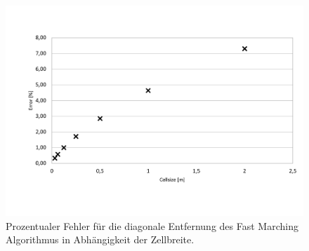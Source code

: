 \begin{figure}[ht]
	\centering
  \includegraphics[width=\textwidth]{abbildungen/vergleich_euklid_fast_marching/EuklidFastMarchingError.pdf}
	\caption{Prozentualer Fehler für die diagonale Entfernung des Fast Marching Algorithmus in Abhängigkeit der Zellbreite.}
	\label{fig_fast_marching_error_cellsize}
\end{figure}


